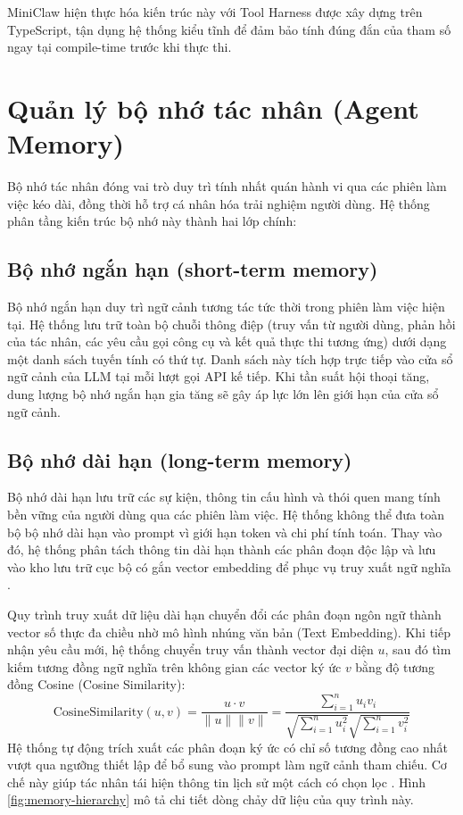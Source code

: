 MiniClaw hiện thực hóa kiến trúc này với Tool Harness được xây dựng trên TypeScript, tận dụng hệ thống kiểu tĩnh để đảm bảo tính đúng đắn của tham số ngay tại compile-time trước khi thực thi.

\section{Quản lý bộ nhớ tác nhân (Agent Memory)}
Bộ nhớ tác nhân đóng vai trò duy trì tính nhất quán hành vi qua các phiên làm việc kéo dài, đồng thời hỗ trợ cá nhân hóa trải nghiệm người dùng. Hệ thống phân tầng kiến trúc bộ nhớ này thành hai lớp chính:

\subsection{Bộ nhớ ngắn hạn (short-term memory)}
Bộ nhớ ngắn hạn duy trì ngữ cảnh tương tác tức thời trong phiên làm việc hiện tại. Hệ thống lưu trữ toàn bộ chuỗi thông điệp (truy vấn từ người dùng, phản hồi của tác nhân, các yêu cầu gọi công cụ và kết quả thực thi tương ứng) dưới dạng một danh sách tuyến tính có thứ tự. Danh sách này tích hợp trực tiếp vào cửa sổ ngữ cảnh của LLM tại mỗi lượt gọi API kế tiếp. Khi tần suất hội thoại tăng, dung lượng bộ nhớ ngắn hạn gia tăng sẽ gây áp lực lớn lên giới hạn của cửa sổ ngữ cảnh.

\subsection{Bộ nhớ dài hạn (long-term memory)}
Bộ nhớ dài hạn lưu trữ các sự kiện, thông tin cấu hình và thói quen mang tính bền vững của người dùng qua các phiên làm việc. Hệ thống không thể đưa toàn bộ bộ nhớ dài hạn vào prompt vì giới hạn token và chi phí tính toán. Thay vào đó, hệ thống phân tách thông tin dài hạn thành các phân đoạn độc lập và lưu vào kho lưu trữ cục bộ có gắn vector embedding để phục vụ truy xuất ngữ nghĩa \cite{memverge2026memmachine}.

Quy trình truy xuất dữ liệu dài hạn chuyển đổi các phân đoạn ngôn ngữ thành vector số thực đa chiều nhờ mô hình nhúng văn bản (Text Embedding). Khi tiếp nhận yêu cầu mới, hệ thống chuyển truy vấn thành vector đại diện $u$, sau đó tìm kiếm tương đồng ngữ nghĩa trên không gian các vector ký ức $v$ bằng độ tương đồng Cosine (Cosine Similarity):
\begin{equation}
  \text{CosineSimilarity}(u, v) = \frac{u \cdot v}{\|u\| \|v\|} = \frac{\sum_{i=1}^{n} u_i v_i}{\sqrt{\sum_{i=1}^{n} u_i^2} \sqrt{\sum_{i=1}^{n} v_i^2}}
\end{equation}
Hệ thống tự động trích xuất các phân đoạn ký ức có chỉ số tương đồng cao nhất vượt qua ngưỡng thiết lập để bổ sung vào prompt làm ngữ cảnh tham chiếu. Cơ chế này giúp tác nhân tái hiện thông tin lịch sử một cách có chọn lọc \cite{yu2026agentic}. Hình \ref{fig:memory-hierarchy} mô tả chi tiết dòng chảy dữ liệu của quy trình này.

